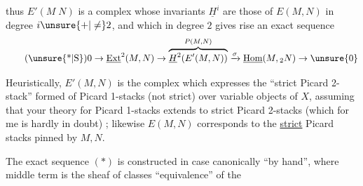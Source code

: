 \margin{\mbox{-- --}}

thus $E'(M\;N)$ is a complex whose invariants $\underline{H}^{i}$ are those of $E(M,N)$ in degree $i\unsure{+|\ne}2$, and which in degree $2$ gives rise  an exact sequence
\begingroup
\makeatletter\tagsleft@true\makeatother
\[
\tag*{(\unsure{*|S})}
0\to\underline{\mathrm{Ext}}^{2}(M,N)\to
\overbrace{\underline{H}^{2}\!\left(E'(M,N)\right)}^{P(M,N)}
\xrightarrow{\sigma}\underline{\mathrm{Hom}}(M,{}_{2}N)\to \unsure{0}
\]
\endgroup

Heuristically, $E'(M,N)$ is the complex which expresses the ``strict Picard 2-stack'' formed of Picard 1-stacks (not  strict)  over variable objects of $X$, assuming that your theory for  Picard 1-stacks extends to strict Picard 2-stacks (which for me is hardly in doubt) ; likewise $E(M,N)$ corresponds to the \uline{strict} Picard stacks pinned by $M,N$.

The exact sequence $(*)$ is constructed in  case canonically ``by hand'', where  middle term is the sheaf of classes  ``equivalence'' of the

